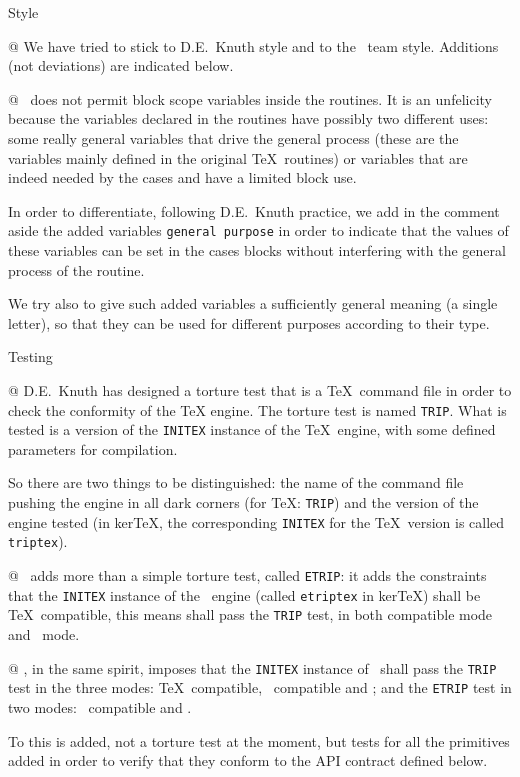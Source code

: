 \begindiv Style

@ We have tried to stick to D.E.~Knuth style and to the \NTS\ team
style. Additions (not deviations) are indicated below.

@ \PASCAL\ does not permit block scope variables inside the routines. It
is an unfelicity because the variables declared in the
routines have possibly two different uses: some really general
variables that drive the general process (these are the
variables mainly defined in the original \TeX\ routines) or variables
that are indeed needed by the cases and have a limited block use.

In order to differentiate, following D.E.~Knuth practice, we add in the
comment aside the added variables {\tt general purpose} in order to
indicate that the values of these variables can be set in the cases
blocks without interfering with the general process of the routine.

We try also to give such added variables a sufficiently general meaning
(a single letter), so that they can be used for different purposes
according to their type.

\enddiv %

\begindiv Testing

@ D.E.~Knuth has designed a torture test that is a \TeX\ command file in
order to check the conformity of the TeX engine. The torture test is
named {\tt TRIP}. What is tested is a version of the {\tt INITEX}
instance of the \TeX\ engine, with some defined parameters for
compilation.

So there are two things to be distinguished: the name of the command
file pushing the engine in all dark corners (for \TeX: {\tt TRIP}) and
the version of the engine tested (in ker\TeX, the corresponding
{\tt INITEX} for the \TeX\ version is called {\tt triptex}).

@ \eTeX\ adds more than a simple torture test, called {\tt ETRIP}: it
adds the constraints that the {\tt INITEX} instance of the \eTeX\ engine
(called {\tt etriptex} in ker\TeX) shall be \TeX\ compatible, this means
shall pass the {\tt TRIP} test, in both compatible mode and \eTeX\ mode.

@ \Prote, in the same spirit, imposes that the {\tt INITEX} instance of
\Prote\ shall pass the {\tt TRIP} test in the three modes: \TeX\
compatible, \eTeX\ compatible and \Prote; and the {\tt ETRIP} test in
two modes: \eTeX\ compatible and \Prote.

To this is added, not a torture test at the moment, but tests for all
the primitives added in order to verify that they conform to the API
contract defined below.

